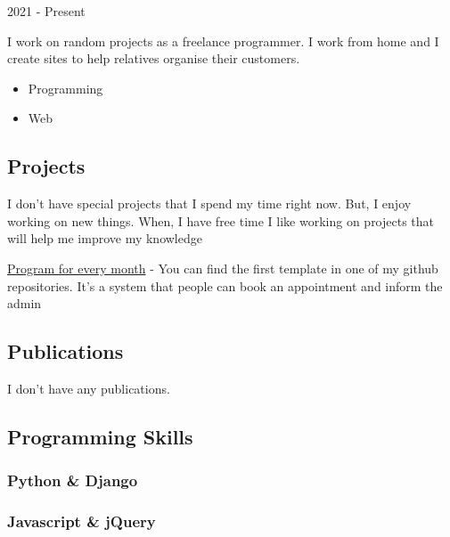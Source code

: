 \documentclass[english,]{article}
\providecommand{\tightlist}{%
  \setlength{\itemsep}{0pt}\setlength{\parskip}{0pt}}
\begin{document}
2021 - Present

I work on random projects as a freelance programmer. I work from home
and I create sites to help relatives organise their customers.

\begin{itemize}
\tightlist
\item
  Programming
\item
  Web
\end{itemize}

\hypertarget{projects}{%
\subsection{\texorpdfstring{{ \emph{} \emph{} }
Projects}{    Projects}}\label{projects}}

I don't have special projects that I spend my time right now. But, I
enjoy working on new things. When, I have free time I like working on
projects that will help me improve my knowledge

{ \protect\hyperlink{}{Program for every month} } - {You can find the
first template in one of my github repositories. It's a system that
people can book an appointment and inform the admin}

\hypertarget{publications}{%
\subsection{\texorpdfstring{{ \emph{} \emph{} }
Publications}{    Publications}}\label{publications}}

I don't have any publications.

\hypertarget{programming-skills}{%
\subsection{\texorpdfstring{{ \emph{} \emph{} } Programming
Skills}{    Programming Skills}}\label{programming-skills}}

\hypertarget{python-django}{%
\subsubsection{Python \& Django}\label{python-django}}

\hypertarget{javascript-jquery}{%
\subsubsection{Javascript \& jQuery}\label{javascript-jquery}}
\end{document}
